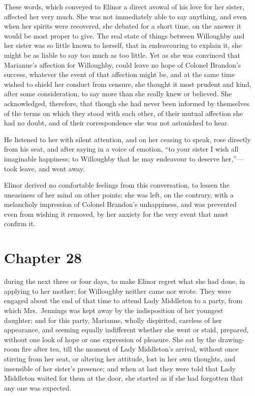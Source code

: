 These words, which conveyed to Elinor a direct avowal
of his love for her sister, affected her very much.
She was not immediately able to say anything, and even
when her spirits were recovered, she debated for a short
time, on the answer it would be most proper to give.
The real state of things between Willoughby and her sister
was so little known to herself, that in endeavouring
to explain it, she might be as liable to say too much
as too little.  Yet as she was convinced that Marianne's
affection for Willoughby, could leave no hope of Colonel
Brandon's success, whatever the event of that affection
might be, and at the same time wished to shield her conduct
from censure, she thought it most prudent and kind,
after some consideration, to say more than she really knew
or believed.  She acknowledged, therefore, that though
she had never been informed by themselves of the terms
on which they stood with each other, of their mutual
affection she had no doubt, and of their correspondence
she was not astonished to hear.

He listened to her with silent attention, and on
her ceasing to speak, rose directly from his seat,
and after saying in a voice of emotion, ``to your sister
I wish all imaginable happiness; to Willoughby that he
may endeavour to deserve her,''---took leave, and went away.

Elinor derived no comfortable feelings from this
conversation, to lessen the uneasiness of her mind on
other points; she was left, on the contrary, with a
melancholy impression of Colonel Brandon's unhappiness,
and was prevented even from wishing it removed,
by her anxiety for the very event that must confirm it.



\chapter{Chapter 28}


 during the next three or four days,
to make Elinor regret what she had done, in applying
to her mother; for Willoughby neither came nor wrote.
They were engaged about the end of that time to attend
Lady Middleton to a party, from which Mrs.\ Jennings was
kept away by the indisposition of her youngest daughter;
and for this party, Marianne, wholly dispirited,
careless of her appearance, and seeming equally indifferent
whether she went or staid, prepared, without one look
of hope or one expression of pleasure.  She sat by the
drawing-room fire after tea, till the moment of Lady
Middleton's arrival, without once stirring from her seat,
or altering her attitude, lost in her own thoughts,
and insensible of her sister's presence; and when at
last they were told that Lady Middleton waited for them
at the door, she started as if she had forgotten that
any one was expected.

